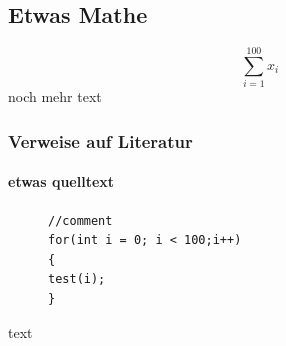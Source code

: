 \documentclass[hyperref,english,bachelorofscience,bibnum]{cgvpub}
\begin{document}
\subsection{Etwas Mathe}

\[
\sum_{i=1}^{100}x_i
\]
noch mehr text
\subsubsection{Verweise auf Literatur} 

\paragraph{etwas quelltext}


\begin{figure}[htbp]
\begin{lstlisting}[frame=trbl]
//comment
for(int i = 0; i < 100;i++)
{
test(i);
}
\end{lstlisting}
\end{figure}

text

\cite*{}
\end{document}

